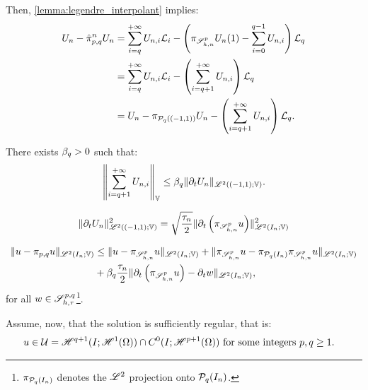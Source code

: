 Then, \cref{lemma:legendre_interpolant} implies:
\begin{align}
    U_n - \hat{\pi}_{p, q}^n U_n &= \sum_{i = q}^{+\infty} U_{n, i} \mathcal{L}_i - \left( \pi_{\mathscr{S}^p_{h, n}} U_n(1) - \sum_{i = 0}^{q - 1} U_{n, i} \right) \mathcal{L}_q \notag \\
    &= \sum_{i = q}^{+\infty} U_{n, i} \mathcal{L}_i - \left( \sum_{i = q + 1}^{+\infty} U_{n, i} \right) \mathcal{L}_q \notag \\
    &= U_n - \pi_{\mathcal{P}_{q}((-1, 1))} U_n - \left( \sum_{i = q + 1}^{+\infty} U_{n, i} \right) \mathcal{L}_q.
\end{align}

\begin{lemma}
    There exists $\beta_{q} > 0$ such that:
    \begin{align}
        \left\lVert \sum_{i = q + 1}^{+\infty} U_{n, i} \right\rVert_{\mathbb{V}} \leq \beta_{q} \lVert \partial_t U_n \rVert_{\mathscr{L}^{2}((-1, 1); \mathbb{V})}.
    \end{align}
\end{lemma}

\begin{lemma}
    \begin{align}
        \lVert \partial_t U_n \rVert_{\mathscr{L}^{2}((-1, 1); \mathbb{V})}^2 = \sqrt{\frac{\tau_n}{2}} \lVert \partial_t \left( \pi_{\mathscr{S}^p_{h, n}} u \right) \rVert_{\mathscr{L}^{2}(I_n; \mathbb{V})}^2
    \end{align}
\end{lemma}

\begin{lemma}
    \begin{align}
        \lVert u - \pi_{p, q} u \rVert_{\mathscr{L}^{2}(I_n; \mathbb{V})} &\leq \lVert u - \pi_{\mathscr{S}^p_{h, n}} u \rVert_{\mathscr{L}^{2}(I_n; \mathbb{V})} + \lVert \pi_{\mathscr{S}^p_{h, n}} u - \pi_{\mathcal{P}_{q}(I_n)} \pi_{\mathscr{S}^p_{h, n}} u \rVert_{\mathscr{L}^{2}(I_n; \mathbb{V})} \\
        &+ \beta_{q} \frac{\tau_n}{2} \lVert \partial_t \left( \pi_{\mathscr{S}^p_{h, n}} u \right) - \partial_t w \rVert_{\mathscr{L}^{2}(I_n; \mathbb{V})}, \notag
    \end{align}
    for all $w \in \mathscr{S}^{p, q}_{h, \tau}$\footnote{$\pi_{\mathcal{P}_{q}(I_n)}$ denotes the $\mathscr{L}^{2}$ projection onto $\mathcal{P}_{q}(I_n)$.}.
\end{lemma}

Assume, now, that the solution is sufficiently regular, that is:
\begin{align}
    u \in \mathcal{U} = \mathscr{H}^{q + 1}(I; \mathscr{H}^{1}(\Omega)) \cap C^0(I; \mathscr{H}^{p + 1}(\Omega)) &\text{ for some integers } p, q \geq 1.
\end{align}

